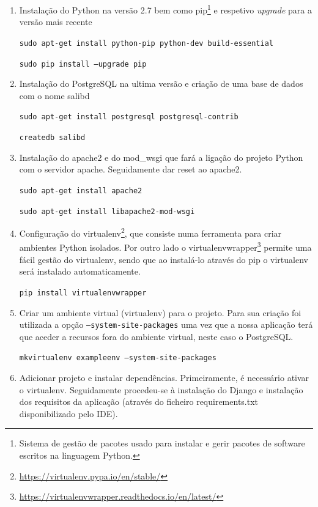 \begin{enumerate}
	\item Instalação do Python na versão 2.7 bem como pip\footnote{Sistema de gestão de pacotes usado para instalar e gerir pacotes de software escritos na linguagem Python.} e respetivo \textit{upgrade} para a versão mais recente
	
	\texttt{sudo apt-get install python-pip python-dev build-essential}
	
	\texttt{sudo pip install --upgrade pip}
	
	
	\item Instalação do PostgreSQL na ultima versão e criação de uma base de dados com o nome salibd
	
	
	\texttt{sudo apt-get install postgresql postgresql-contrib}

	\texttt{createdb salibd}	
	
	
	\item Instalação do apache2 e do mod\_wsgi que fará a ligação do projeto Python com o servidor apache. Seguidamente dar reset ao apache2.
	
	\texttt{sudo apt-get install apache2}
	
	\texttt{sudo apt-get install libapache2-mod-wsgi}
	
	
	\item Configuração do virtualenv\footnote{\url{https://virtualenv.pypa.io/en/stable/}}, que consiste numa ferramenta para criar ambientes Python isolados. Por outro lado o virtualenvwrapper\footnote{\url{https://virtualenvwrapper.readthedocs.io/en/latest/}} permite uma fácil gestão do virtualenv, sendo que ao instalá-lo através do pip o virtualenv será instalado automaticamente. 
	
	
	\texttt{pip install virtualenvwrapper}
	
	 
	\item Criar um ambiente virtual (virtualenv) para o projeto. Para sua criação foi utilizada a opção \texttt{--system-site-packages} uma vez que a nossa aplicação terá que aceder a recursos fora do ambiente virtual, neste caso o PostgreSQL. 
	
	\texttt{mkvirtualenv exampleenv --system-site-packages}
	
	
	\item Adicionar projeto e instalar dependências. Primeiramente, é necessário ativar o virtualenv. Seguidamente procedeu-se à instalação do Django e instalação dos requisitos da aplicação (através do ficheiro requirements.txt disponibilizado pelo IDE). 
	

\end{enumerate}
